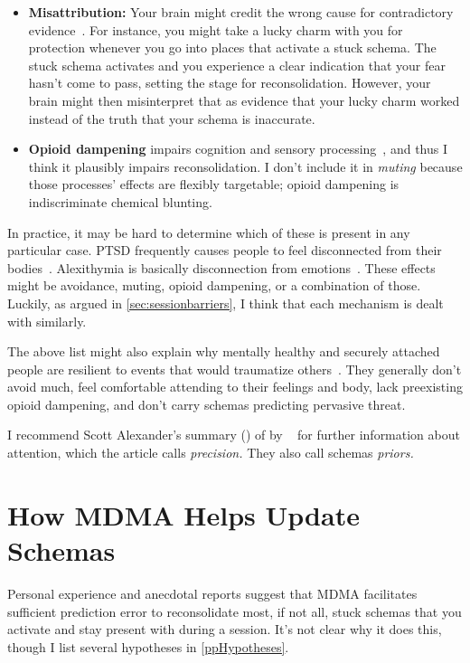 \documentclass[11pt,oneside]{book}
\let\cite\parencite
\newcommand{\prosecite}[1]{\citetitle{#1} by \citefullauthor{#1}~\cite{#1}}
\begin{document}
\begin{itemize}
    More generally, the brain may inaccurately learn that certain information isn't useful or reliable and stops paying any attention to it. For instance, the sensory muting of depression (colors appear more gray~\cite{alexanderPrecision}) plausibly follows from a \enquote{nothing matters} schema since, if nothing matters, sensory input is not useful.
    \item \textbf{Misattribution:} Your brain might credit the wrong cause for contradictory evidence~\cite{salkovskisImportanceBehaviourMaintenance1991}. For instance, you might take a lucky charm with you for protection whenever you go into places that activate a stuck schema. The stuck schema activates and you experience a clear indication that your fear hasn't come to pass, setting the stage for reconsolidation. However, your brain might then misinterpret that as evidence that your lucky charm worked instead of the truth that your schema is inaccurate.
    \item \textbf{Opioid dampening} impairs cognition and sensory processing~\cite{cheetahSigns}, and thus I think it plausibly impairs reconsolidation. I don't include it in \textit{muting} because those processes' effects are flexibly targetable; opioid dampening is indiscriminate chemical blunting.
\end{itemize}

In practice, it may be hard to determine which of these is present in any particular case. PTSD frequently causes people to feel disconnected from their bodies~\cite{vanderKolkBody}. Alexithymia is basically disconnection from emotions~\cite{hogeveen2021alexithymia}. These effects might be avoidance, muting, opioid dampening, or a combination of those. Luckily, as argued in \cref{sec:sessionbarriers}, I think that each mechanism is dealt with similarly.
 
The above list might also explain why mentally healthy and securely attached people are resilient to events that would traumatize others~\cite{attachmentPTSD,bonanno2008loss}. They generally don't avoid much, feel comfortable attending to their feelings and body, lack preexisting opioid dampening, and don't carry schemas predicting pervasive threat.

I recommend Scott Alexander's summary (\textcite{alexanderPrecision}) of \prosecite{berghBSTS} for further information about attention, which the article calls \textit{precision.} They also call schemas \textit{priors.}

\section{How MDMA Helps Update Schemas}
\label{mdmaUpdate}
Personal experience and anecdotal reports suggest that MDMA facilitates sufficient prediction error to reconsolidate most, if not all, stuck schemas that you activate and stay present with during a session. It's not clear why it does this, though I list several hypotheses in \cref{ppHypotheses}.
\end{document}
